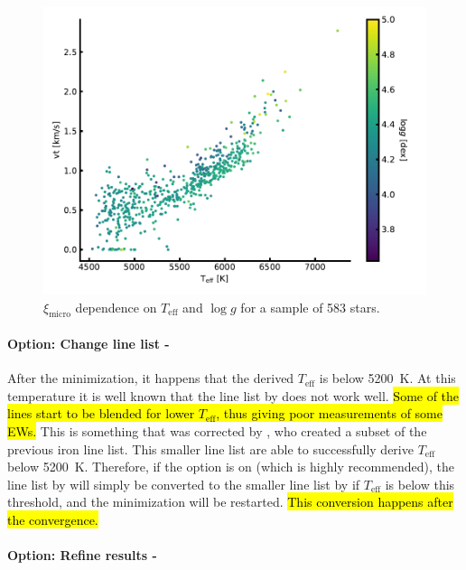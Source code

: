 \begin{figure}[htpb!]
    \centering
    \includegraphics[width=0.8\linewidth]{figures/vtRelation.pdf}
    \caption{$\xi_\mathrm{micro}$ dependence on $T_\mathrm{eff}$ and $\log g$ for a sample of 583
             stars.}
    \label{fig:vtRelation}
\end{figure}

\paragraph{Option: Change line list - }

After the minimization, it happens that the derived $T_\mathrm{eff}$ is below \SI{5200}{K}. At this
temperature it is well known that the line list by \citet{Sousa2008a} does not work well. \hl{Some
of the lines start to be blended for lower $T_\mathrm{eff}$, thus giving poor measurements of some
EWs.} This is something that was corrected by \citet{Tsantaki2013}, who created a subset of the
previous iron line list. This smaller line list are able to successfully derive $T_\mathrm{eff}$
below \SI{5200}{K}. Therefore, if the option  is on (which is highly recommended),
the line list by \citet{Sousa2008a} will simply be converted to the smaller line list by
\citet{Tsantaki2013} if $T_\mathrm{eff}$ is below this threshold, and the minimization will be
restarted. \hl{This conversion happens after the convergence.}

\paragraph{Option: Refine results - }

